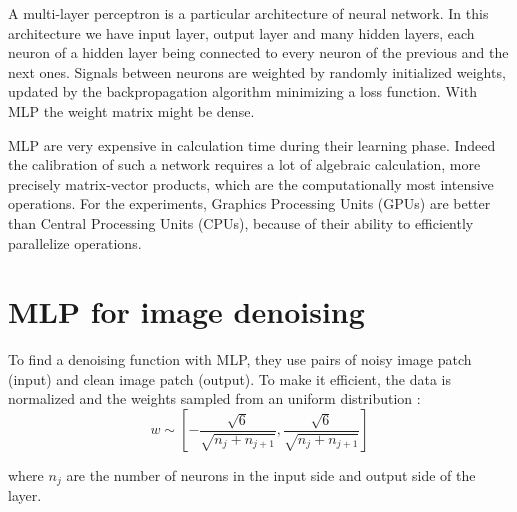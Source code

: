 \documentclass[10pt,a4paper]{article}
\newcommand{\svs}{\vspace{9pt}}
\begin{document}
A multi-layer perceptron is a particular architecture of neural network. In this architecture we have input layer, output layer and many hidden layers, each neuron of a hidden layer being connected to every neuron of the previous and the next ones. Signals between neurons are weighted by randomly initialized weights, updated by the backpropagation algorithm minimizing a loss function. With MLP the weight matrix might be dense.


\svs 



MLP are very expensive in calculation time during their learning phase. Indeed the calibration of such a network requires a lot of algebraic calculation, more precisely matrix-vector products, which are the computationally most intensive operations.
For the experiments, Graphics Processing Units (GPUs) are better than Central Processing Units (CPUs), because of their ability to efficiently parallelize operations.

\svs







\section{MLP for image denoising}


To find a denoising function with MLP, they use pairs of noisy image patch (input) and clean image patch (output). To make it efficient, the data is normalized and the weights sampled from an uniform distribution :  \\%
$$w \sim [-\frac{\sqrt{6}}{\sqrt{n_j + n_{j+1}}}, \frac{\sqrt{6}}{\sqrt{n_j + n_{j+1}}} ]$$ 

\svs
where $n_j$ are the number of neurons in the input side and output side of the layer. 
\end{document}
